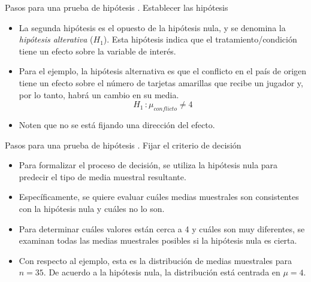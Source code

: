 \documentclass{beamer}
\begin{document}
\begin{frame}{Pasos para una prueba de hipótesis}
	{. Establecer las hipótesis}
\begin{itemize}
	\justifying
\item La segunda hipótesis es el opuesto de la hipótesis nula, y se denomina la \emph{hipótesis alterativa} ($H_1$). Esta hipótesis indica que el tratamiento/condición tiene un efecto sobre la variable de interés.
\item Para el ejemplo, la hipótesis alternativa es que el conflicto en el país de origen tiene un efecto sobre el número de tarjetas amarillas que recibe un jugador y, por lo tanto, habrá un cambio en su media.
$$H_1 \, : \mu_{conflicto}\neq4$$
\item Noten que no se está fijando una dirección del efecto. 
\end{itemize}
\end{frame}

\begin{frame}{Pasos para una prueba de hipótesis}
	{. Fijar el criterio de decisión}
\begin{itemize}
	\justifying
	\item Para formalizar el proceso de decisión, se utiliza la hipótesis nula para predecir el tipo de media muestral resultante.
	\item Específicamente, se quiere evaluar cuáles medias muestrales son consistentes con la hipótesis nula y cuáles no lo son.
	\item Para determinar cuáles valores están cerca a 4 y cuáles son muy diferentes, se examinan todas las medias muestrales posibles si la hipótesis nula es cierta.
	\item Con respecto al ejemplo, esta es la distribución de medias muestrales para $n=35$. De acuerdo a la hipótesis nula, la distribución está centrada en $\mu=4$.
\end{itemize}
\end{frame}
\end{document}
